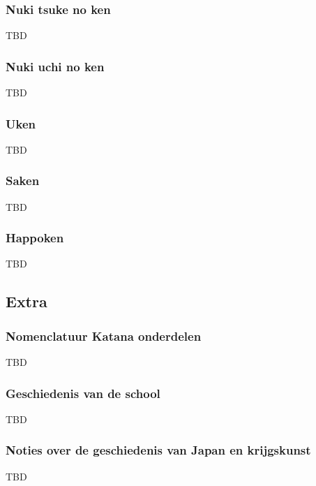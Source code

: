 \subsubsection{Nuki tsuke no ken}

\suwaristart
TBD


\subsubsection{Nuki uchi no ken}

\suwaristart
TBD

\subsubsection{Uken}

\suwaristart
TBD

\subsubsection{Saken}

\suwaristart
TBD

\subsubsection{Happoken}

TBD

\subsection{Extra}

\subsubsection{Nomenclatuur Katana onderdelen}

TBD

\subsubsection{Geschiedenis van de school}

TBD

\subsubsection{Noties over de geschiedenis van Japan en krijgskunst}

TBD
